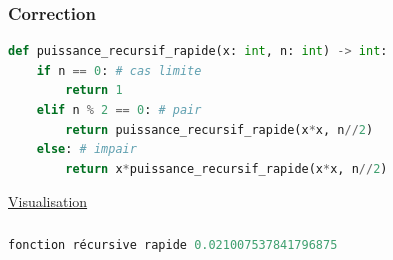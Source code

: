 \documentclass[svgnames,11pt]{beamer}
\begin{document}
\begin{frame}[fragile]
    \frametitle{Correction}

\begin{center}
\begin{lstlisting}[language=Python , basicstyle=\ttfamily\small, xleftmargin=0.5em, xrightmargin=0.5em]
def puissance_recursif_rapide(x: int, n: int) -> int:
    if n == 0: # cas limite
        return 1
    elif n % 2 == 0: # pair
        return puissance_recursif_rapide(x*x, n//2)
    else: # impair
        return x*puissance_recursif_rapide(x*x, n//2)
\end{lstlisting}
\label{CODE}
\end{center}
\begin{center}
    \href{https://pythontutor.com/visualize.html#code=def%20puissance_recursif_rapide%28x,%20n%29%3A%0A%20%20%20%20if%20n%20%3D%3D%200%3A%0A%20%20%20%20%20%20%20%20return%201%0A%20%20%20%20elif%20n%20%25%202%20%3D%3D%200%3A%0A%20%20%20%20%20%20%20%20return%20puissance_recursif_rapide%28x*x,%20n//2%29%0A%20%20%20%20else%3A%0A%20%20%20%20%20%20%20%20return%20x*puissance_recursif_rapide%28x*x,%20n//2%29%0A%0Apuissance_recursif_rapide%283,%205%29&cumulative=false&curInstr=0&heapPrimitives=nevernest&mode=display&origin=opt-frontend.js&py=3&rawInputLstJSON=%5B%5D&textReferences=false}{Visualisation}
\end{center}
\end{frame}
\begin{frame}[fragile]
    \frametitle{}

    \begin{center}
        \begin{lstlisting}[language=Python , basicstyle=\ttfamily\small, xleftmargin=2em, xrightmargin=2em]
fonction récursive rapide 0.021007537841796875
\end{lstlisting}
        \label{CODE}
        \end{center}
\end{frame}
\end{document}
